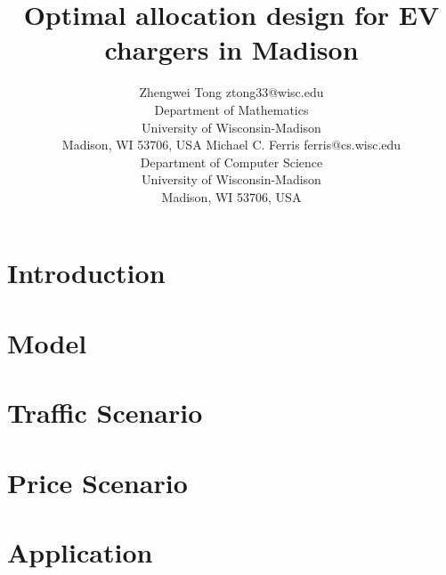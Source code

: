\documentclass[twoside,11pt]{article}
\begin{document}
\title{Optimal allocation design for EV chargers in Madison}

\author{\name Zhengwei Tong \email ztong33@wisc.edu \\
       \addr Department of Mathematics\\
       University of Wisconsin-Madison\\
       Madison, WI 53706, USA
       \AND
       \name Michael C. Ferris \email ferris@cs.wisc.edu \\
       \addr Department of Computer Science\\
       University of Wisconsin-Madison\\
       Madison, WI 53706, USA}


\maketitle

\begin{abstract}%

\end{abstract}


\section{Introduction}



\section{Model}


\section{Traffic Scenario}


\section{Price Scenario}


\section{Application}

\end{document}
